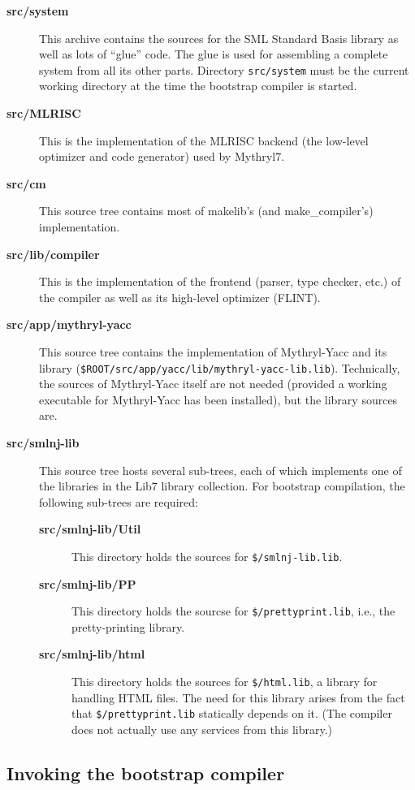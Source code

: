 \begin{description}
\item[{\bf src/system}] This archive contains the sources for the SML
Standard Basis library as well as lots of ``glue'' code.  The glue is
used for assembling a complete system from all its other parts.
Directory {\tt src/system} must be the current working directory at
the time the bootstrap compiler is started.
\item[{\bf src/MLRISC}] This is the implementation of the MLRISC
backend (the low-level optimizer and code generator) used by Mythryl7.
\item[{\bf src/cm}] This source tree contains most of makelib's (and make_compiler's)
implementation.
\item[{\bf src/lib/compiler}] This is the implementation of the frontend
(parser, type checker, etc.) of the compiler as well as its high-level
optimizer (FLINT).
\item[{\bf src/app/mythryl-yacc}] This source tree contains the implementation
of Mythryl-Yacc and its library ({\tt \$ROOT/src/app/yacc/lib/mythryl-yacc-lib.lib}).
Technically, the sources of Mythryl-Yacc itself are not needed (provided a
working executable for Mythryl-Yacc has been installed), but the library
sources are.
\item[{\bf src/smlnj-lib}] This source tree hosts several sub-trees,
each of which implements one of the libraries in the Lib7 library
collection.  For bootstrap compilation, the following sub-trees are
required:
\begin{description}
\item[{\bf src/smlnj-lib/Util}] This directory holds the sources for
{\tt \$/smlnj-lib.lib}.
\item[{\bf src/smlnj-lib/PP}] This directory holds the sourcse for
{\tt \$/prettyprint.lib}, i.e., the pretty-printing library.
\item[{\bf src/smlnj-lib/html}] This directory holds the sources for
{\tt \$/html.lib}, a library for handling HTML files.  The need for
this library arises from the fact that {\tt \$/prettyprint.lib} statically
depends on it.  (The compiler does not actually use any services from
this library.)
\end{description}
\end{description}

\subsection{Invoking the bootstrap compiler}

